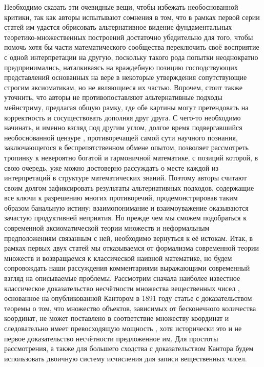 \documentclass[12pt]{article}
\begin{document}
Необходимо сказать эти очевидные вещи, чтобы избежать необоснованной критики, так как авторы испытывают сомнения в том, что в рамках первой серии статей им удастся обрисовать альтернативное видение фундаментальных теоретико-множественных построений достаточно убедительно для того, чтобы помочь хотя бы части математического сообщества переключить своё восприятие с одной интерпретации на другую, поскольку такого рода попытки неоднократно предпринимались, наталкиваясь на враждебную позицию господствующих представлений основанных на вере в некоторые утверждения сопутствующие строгим аксиоматикам, но не являющиеся их частью. Впрочем, стоит также уточнить, что авторы не противопоставляют альтернативные подходы мейнстриму, предлагая общую рамку, где обе картины могут претендовать на корректность и сосуществовать дополняя друг друга. С  чего-то необходимо начинать, и именно взгляд под другим углом, долгое время подвергавшийся необоснованной цензуре \cite{transfinity}, противоречащей самой сути научного познания, заключающегося в беспрепятственном обмене опытом, позволяет рассмотреть тропинку к невероятно богатой и гармоничной математике, с позиций которой, в свою очередь, уже можно достоверно рассуждать о месте каждой из интерпретаций в структуре математических знаний. Поэтому авторы считают своим долгом зафиксировать результаты альтернативных подходов, содержащие все ключи к разрешению многих противоречий, продемонстрировав таким образом банальную истину: взаимопонимание и взаимоуважение оказываются зачастую продуктивней неприятия. Но прежде чем мы сможем подобраться к современной аксиоматической теории множеств и неформальным предположениям связанным с ней, необходимо вернуться к её истокам. Итак, в рамках первых двух статей мы отказываемся от формализма современной теории множеств и возвращаемся к классической наивной математике, но будем сопровождать наши рассуждения комментариями выражающими современный взгляд на описываемые проблемы. Рассмотрим сначала наиболее известное классическое доказательство несчётности множества вещественных чисел \cite{matan-diagonal}, основанное на опубликованной Кантором в 1891 году статье с доказательством теоремы о том, что множество объектов, зависимых от бесконечного количества координат, не может поставлено в соответствие множеству координат и следовательно имеет превосходящую мощность \cite{diagonal}, хотя исторически это и не первое доказательство несчётности предложенное им. Для простоты рассмотрения, а также для большего сходства с доказательством Кантора будем использовать двоичную систему исчисления для записи вещественных чисел.
\end{document}
